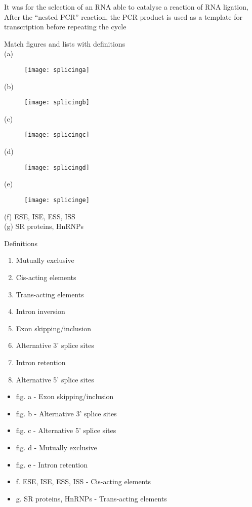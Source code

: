 \begin{Answer} [
  ref={ex43},
  number={1}
 ]

\Question It was for the selection of an RNA able to catalyse a reaction of RNA
ligation, After the ``nested PCR'' reaction, the PCR product is used as a
template for transcription before repeating the cycle

\end{Answer}

\begin{Exercise} [
  label={ex44},
  origin={G. Valle}
 ]

\Question Match figures and lists with definitions\\
(a)
\begin{figure}[H]
\texttt{[image: splicinga]}
\end{figure}
(b)
\begin{figure}[H]
\texttt{[image: splicingb]}
\end{figure}
(c)
\begin{figure}[H]
\texttt{[image: splicingc]}
\end{figure}
(d)
\begin{figure}[H]
\texttt{[image: splicingd]}
\end{figure}
(e)
\begin{figure}[H]
\texttt{[image: splicinge]}
\end{figure}
(f) ESE, ISE, ESS, ISS \\
(g) SR proteins, HnRNPs

Definitions
\begin{enumerate}
\item Mutually exclusive
\item Cis-acting elements
\item Trans-acting elements
\item Intron inversion
\item Exon skipping/inclusion
\item Alternative 3' splice sites
\item Intron retention
\item Alternative 5' splice sites
\end{enumerate}

\end{Exercise}

\begin{Answer} [
  ref={ex44},
  number={1}
 ]

\Question 
\begin{itemize}
\item fig. a - Exon skipping/inclusion
\item fig. b - Alternative 3' splice sites
\item fig. c - Alternative 5' splice sites
\item fig. d - Mutually exclusive
\item fig. e - Intron retention
\item f. ESE, ISE, ESS, ISS - Cis-acting elements
\item g. SR proteins, HnRNPs - Trans-acting elements
\end{itemize}
\end{Answer}